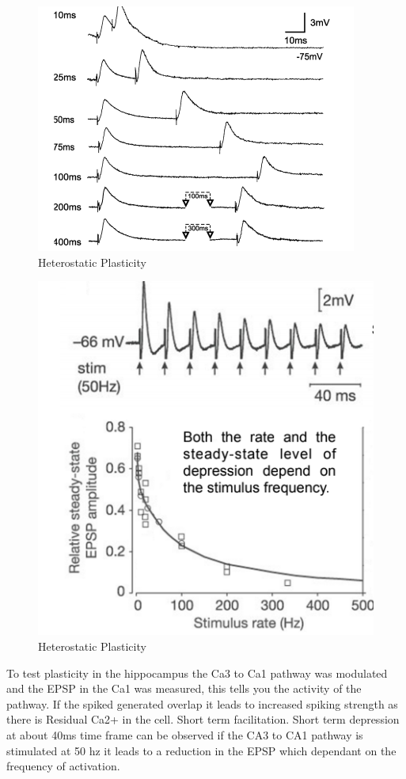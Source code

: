 \documentclass[main]{subfiles}
\begin{document}
\begin{figure}[H]
    \centering
    \includegraphics[width=.6\textwidth]{03_PlasticityInTheBrain/figures/pasted_image_9.png}
    \caption{Heterostatic Plasticity}
    \label{fig:syn_plas1t}
\end{figure}

\begin{figure}[H]
    \centering
    \includegraphics[width=.6\textwidth]{03_PlasticityInTheBrain/figures/pasted_image_10.png}
    \caption{Heterostatic Plasticity}
    \label{fig:syn_plas1t}
\end{figure}

To test plasticity in the hippocampus the Ca3 to Ca1 pathway was modulated and the EPSP in the Ca1 was measured, this tells you the activity of the pathway. If the spiked generated overlap it leads to increased spiking strength as there is Residual Ca2+ in the cell. Short term facilitation. Short term depression at about 40ms time frame can be observed if the CA3 to CA1 pathway is stimulated at 50 hz it leads to a reduction in the EPSP which dependant on the frequency of activation.
\end{document}
